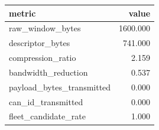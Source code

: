 \begin{tabular}{lr}
\toprule
metric & value \\
\midrule
raw_window_bytes & 1600.000 \\
descriptor_bytes & 741.000 \\
compression_ratio & 2.159 \\
bandwidth_reduction & 0.537 \\
payload_bytes_transmitted & 0.000 \\
can_id_transmitted & 0.000 \\
fleet_candidate_rate & 1.000 \\
\bottomrule
\end{tabular}
